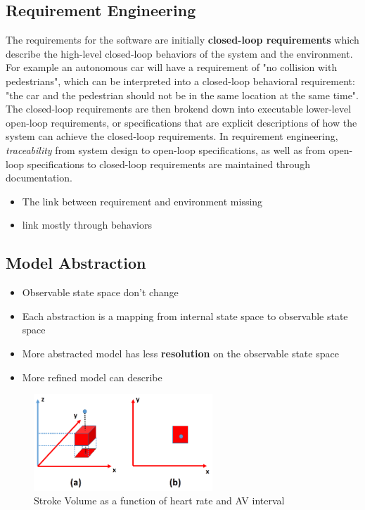 \documentclass{llncs}
\begin{document}
\subsection{Requirement Engineering}
The requirements for the software are initially \textbf{closed-loop requirements} which describe the high-level closed-loop behaviors of the system and the environment. For example an autonomous car will have a requirement of "no collision with pedestrians", which can be interpreted into a closed-loop behavioral requirement: "the car and the pedestrian should not be in the same location at the same time". The closed-loop requirements are then brokend down into executable lower-level open-loop requirements, or specifications that are explicit descriptions of how the system can achieve the closed-loop requirements. In requirement engineering, \emph{traceability} from system design to open-loop specifications, as well as from open-loop specifications to closed-loop requirements are maintained through documentation. 
\begin{itemize}
	\item The link between requirement and environment missing
    \item link mostly through behaviors
\end{itemize}
\subsection{Model Abstraction}
\begin{itemize}
	\item Observable state space don't change
    \item Each abstraction is a mapping from internal state space to observable state space
    \item More abstracted model has less \textbf{resolution} on the observable state space 
    \item More refined model can describe
\end{itemize}
\begin{figure}[!t]
		\centering
		\includegraphics[width=0.6\textwidth]{figs/mapping.png}
		\caption{\small Stroke Volume as a function of heart rate and AV interval}
		\label{fig:map}
\end{figure}
\end{document}
